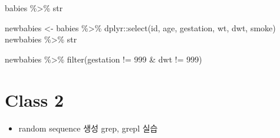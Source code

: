 \documentclass[
]{book}
\newenvironment{Shaded}{\begin{snugshade}}{\end{snugshade}}
\newcommand{\DecValTok}[1]{\textcolor[rgb]{0.00,0.00,0.81}{#1}}
\newcommand{\FunctionTok}[1]{\textcolor[rgb]{0.00,0.00,0.00}{#1}}
\newcommand{\NormalTok}[1]{#1}
\newcommand{\OtherTok}[1]{\textcolor[rgb]{0.56,0.35,0.01}{#1}}
\newcommand{\SpecialCharTok}[1]{\textcolor[rgb]{0.00,0.00,0.00}{#1}}
\providecommand{\tightlist}{%
  \setlength{\itemsep}{0pt}\setlength{\parskip}{0pt}}
\begin{document}
\begin{Shaded}
\begin{Highlighting}[]
\NormalTok{babies }\SpecialCharTok{\%\textgreater{}\%}\NormalTok{ str}

\NormalTok{newbabies }\OtherTok{\textless{}{-}}\NormalTok{ babies }\SpecialCharTok{\%\textgreater{}\%} 
\NormalTok{  dplyr}\SpecialCharTok{::}\FunctionTok{select}\NormalTok{(id, age, gestation, wt, dwt, smoke)}
\NormalTok{newbabies }\SpecialCharTok{\%\textgreater{}\%}\NormalTok{ str}

\NormalTok{newbabies }\SpecialCharTok{\%\textgreater{}\%} 
  \FunctionTok{filter}\NormalTok{(gestation }\SpecialCharTok{!=} \DecValTok{999} \SpecialCharTok{\&}\NormalTok{ dwt }\SpecialCharTok{!=} \DecValTok{999}\NormalTok{) }
\end{Highlighting}
\end{Shaded}

\hypertarget{class-2-1}{%
\section{Class 2}\label{class-2-1}}

\begin{itemize}
\tightlist
\item
  random sequence 생성 grep, grepl 실습
\end{itemize}
\end{document}
